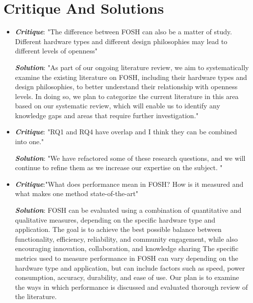 \documentclass[acmtog]{acmart}
\begin{document}



\appendix

\section{Critique And Solutions}
\begin{itemize}
\item {\textbf{\itshape Critique}}: "The difference between FOSH can also be a matter of study. Different hardware types and different design philosophies may lead to different levels of openness"
\par{\textbf{\itshape Solution}}: "As part of our ongoing literature review, we aim to systematically examine the existing literature on FOSH, including their hardware types and design philosophies, to better understand their relationship with openness levels. In doing so, we plan to categorize the current literature in this area based on our systematic review, which will enable us to identify any knowledge gaps and areas that require further investigation."
\item {\textbf{\itshape Critique}}: "RQ1 and RQ4 have overlap and I think they can be combined into one."
\par{\textbf{\itshape Solution}}: "We have refactored some of these research questions, and we will continue to refine them as we increase our expertise on the subject. "
\item {\textbf{\itshape Critique}}:"What does performance mean in FOSH? How is it measured and what makes one method state-of-the-art"
\par{\textbf{\itshape Solution}}: 
FOSH can be evaluated using a combination of quantitative and qualitative measures, depending on the specific hardware type and application. The goal is to achieve the best possible balance between functionality, efficiency, reliability, and community engagement, while also encouraging innovation, collaboration, and knowledge sharing
The specific metrics used to measure performance in FOSH can vary depending on the hardware type and application, but can include factors such as speed, power consumption, accuracy, durability, and ease of use. Our plan is to examine the ways in which performance is discussed and evaluated thorough review of the literature.


\end{itemize}
\end{document}
